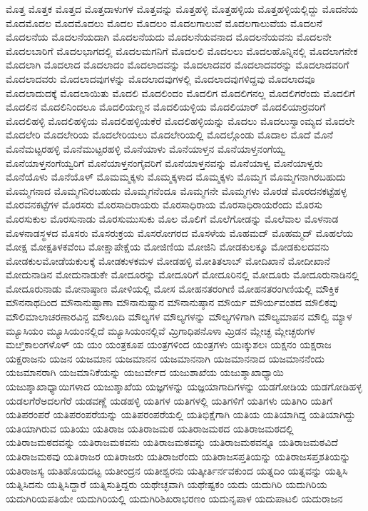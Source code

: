 {ಮೊತ್ತ
ಮೊತ್ತಕ
ಮೊತ್ತದ
ಮೊತ್ತದಾಳುಗಳ
ಮೊತ್ತವನ್ನು
ಮೊತ್ತಹಳ್ಳಿ
ಮೊತ್ತಹಳ್ಳಿಯ
ಮೊತ್ತಹಳ್ಳಿಯಲ್ಲಿದ್ದು
ಮೊದನೆಯ
ಮೊದಮೊದಲ
ಮೊದಮೊದಲು
ಮೊದಲ
ಮೊದಲಂ
ಮೊದಲಗಾಲುವೆ
ಮೊದಲಗಾಲುವೆಯ
ಮೊದಲನೆ
ಮೊದಲನೆಯ
ಮೊದಲನೆಯದಾಗಿ
ಮೊದಲನೆಯದು
ಮೊದಲನೆಯವನಾದ
ಮೊದಲನೆಯವನು
ಮೊದಲನೇ
ಮೊದಲಬಾರಿಗೆ
ಮೊದಲಭಾಗದಲ್ಲಿ
ಮೊದಲಮಗನಿಗೆ
ಮೊದಲಲಿ
ಮೊದಲಲು
ಮೊದಲಹೊನ್ನಿನಲ್ಲಿ
ಮೊದಲಾಗನೇಕ
ಮೊದಲಾಗಿ
ಮೊದಲಾದ
ಮೊದಲಾದಂ
ಮೊದಲಾದವನ್ನು
ಮೊದಲಾದವರ
ಮೊದಲಾದವರನ್ನು
ಮೊದಲಾದವರಿಗೆ
ಮೊದಲಾದವರು
ಮೊದಲಾದವುಗಳನ್ನು
ಮೊದಲಾದವುಗಳಲ್ಲಿ
ಮೊದಲಾದವುಗಳಿದ್ದವು
ಮೊದಲಾದವೂ
ಮೊದಲಾದುದಕ್ಕೆ
ಮೊದಲಾಯಿತು
ಮೊದಲಿ
ಮೊದಲಿಂದಂ
ಮೊದಲಿಗ
ಮೊದಲಿಗನಲ್ಲ
ಮೊದಲಿಗರೆಂದು
ಮೊದಲಿಗೆ
ಮೊದಲಿನ
ಮೊದಲಿನಿಂದಲೂ
ಮೊದಲಿಯಣ್ಣನ
ಮೊದಲಿಯಳ್ಳಿಯ
ಮೊದಲಿಯಾರ್
ಮೊದಲಿಯಾರ್ರವರಿಗೆ
ಮೊದಲಿಹಳ್ಳಿ
ಮೊದಲಿಹಳ್ಳಿಯ
ಮೊದಲಿಹಳ್ಳಿಯಕೆರೆ
ಮೊದಲಿಹಳ್ಳಿಯನ್ನು
ಮೊದಲು
ಮೊದಲುಸ್ವಾಂಮ್ಯದ
ಮೊದಲೇ
ಮೊದಲೇರಿ
ಮೊದಲೇರಿಯ
ಮೊದಲೇರಿಯಲು
ಮೊದಲೇರಿಯಲ್ಲಿ
ಮೊದಲ್ಗೊಂಡು
ಮೊದಾಲ
ಮೊದೆ
ಮೊನೆ
ಮೊನೆಮಟ್ಟರಹಳ್ಳಿ
ಮೊನೆಮುಟ್ಟರಹಳ್ಳಿ
ಮೊನೆಯಾಳು
ಮೊನೆಯಾಳ್ತನ
ಮೊನೆಯಾಳ್ತನಂಗೆಯ್ವ
ಮೊನೆಯಾಳ್ತನಂಗೆಯ್ವರಿಗೆ
ಮೊನೆಯಾಳ್ತನಂಗೈವರಿಗೆ
ಮೊನೆಯಾಳ್ತನವನ್ನು
ಮೊನೆಯಾಳ್ವ
ಮೊನೆಯಾಳ್ವರು
ಮೊನೆಯೊಳು
ಮೊನೆಯೊಳ್
ಮೊಮಮ್ಮಕ್ಕಳು
ಮೊಮ್ಮಕ್ಕಳಾದ
ಮೊಮ್ಮಕ್ಕಳು
ಮೊಮ್ಮಗ
ಮೊಮ್ಮಗನಾಗಿರಬಹುದು
ಮೊಮ್ಮಗನಾದ
ಮೊಮ್ಮಗನಿರಬಹುದು
ಮೊಮ್ಮಗನೆಂದೂ
ಮೊಮ್ಮಗನೇ
ಮೊಮ್ಮಗಳು
ಮೊರಡೆ
ಮೊರದನಕಟ್ಟೆಹಳ್ಳ
ಮೊರವನಕಟ್ಟೆಗಳ
ಮೊರಸರು
ಮೊರಸಾದಿರಾಯರು
ಮೊರಸಾಧಿರಾಯ
ಮೊರಸಾಧಿರಾಯರೆಂದು
ಮೊರಸು
ಮೊರಸುಕುಲ
ಮೊರಸುನಾಡು
ಮೊರಸುಮುಸುಕು
ಮೊಲ
ಮೊಲಿಗೆ
ಮೊಲೆಗೋಡನ್ನು
ಮೊಲೆವಾಲ
ಮೊಳನಾಡ
ಮೊಳನಾಡಸ್ಥಳದ
ಮೊಸರು
ಮೊಸರುಕ್ರಯ
ಮೊಸರೋಗರದ
ಮೊಸಳೆಯ
ಮೊಹಮದ್
ಮೊಹಮ್ಮದ್
ಮೊಹಲೆಯ
ಮೋಕ್ಷ
ಮೋಕ್ಷತಿಳಕವೆಂಬ
ಮೋಕ್ಷಾಪೇಕ್ಷೆಯ
ಮೋಜಿಣಿಯ
ಮೋಜಿನಿ
ಮೋಡಕುಲಕ್ಕೂ
ಮೋಡಕುಲದವನು
ಮೋಡಕುಲಮೋಡೆಯಕುಲಕ್ಕೆ
ಮೋಡಕುಳಕಮಳ
ಮೋಡಹಳ್ಳಿ
ಮೋತಿತಲಾಬ್
ಮೋದಿಖಾನೆ
ಮೋದೀಖಾನೆ
ಮೋದುನಾಡಿನ
ಮೋದುನಾಡುಕೇ
ಮೋದೂರನ್ನು
ಮೋದೂರಿಗೆ
ಮೋದೂರಿನಲ್ಲಿ
ಮೋದೂರು
ಮೋದೂರುನಾಡಿನಲ್ಲಿ
ಮೋದೂರುನಾಡು
ಮೋನಾಷ್ಠಾಣ
ಮೋಳಿಯಲ್ಲಿ
ಮೋಸ
ಮೋಹನತರಂಗಿಣಿ
ಮೋಹನತರಂಗಿಣಿಯಲ್ಲಿ
ಮೌಕ್ತಿಕ
ಮೌನನಾಥದಿಂದ
ಮೌನಾನುಷ್ಟಾಣಾ
ಮೌನಾನುಷ್ಟಾನ
ಮೌನಾನುಷ್ಠಾನ
ಮೌರ್ಯ
ಮೌರ್ಯವಂಶದ
ಮೌಲಿಕವು
ಮೌಲಿಮಾಲಾಚರಣಾರವಿನ್ದ
ಮೌಲೂದಿ
ಮೌಲ್ಯಗಳ
ಮೌಲ್ಯಗಳನ್ನು
ಮೌಲ್ಯಗಳಿಗಾಗಿ
ಮೌಲ್ಯಮಾಪನ
ಮೌಲ್ವಿ
ಮ್ಯಾಳ
ಮ್ಯೂಸಿಯಂ
ಮ್ಯೂಸಿಯಂನಲ್ಲಿದೆ
ಮ್ಯೂಸಿಯಂನಲ್ಲಿವೆ
ಮ್ರಿಗಾಧಿಪನೊಳಾ
ಮ್ರಿಡನ
ಮ್ಲೇಚ್ಛ
ಮ್ಲೇಚ್ಛರುಗಳ
ಮೞ್ತಿಕಾಲಂಗಳೊಳ್
ಯ
ಯಂ
ಯಂತ್ರಕೂಪ
ಯಂತ್ರಗಳಿಂದ
ಯಂತ್ರಗಳು
ಯಃಕ್ಕುಶಲಃ
ಯಕ್ಷನಂ
ಯಕ್ಷರಾಜ
ಯಕ್ಷರಾಜನು
ಯಜನ
ಯಜಮಾನ
ಯಜಮಾನನ
ಯಜಮಾನನಾಗಿ
ಯಜಮಾನನಾದ
ಯಜಮಾನನೆಂದು
ಯಜಮಾನರಾಗಿ
ಯಜಮಾನಿಕೆಯನ್ನು
ಯಜುರ್ವೇದ
ಯಜುಶಾಖೆಯ
ಯಜುಶ್ಶಾಖಾಧ್ಯಾಯಿ
ಯಜುಶ್ಶಾಖಾಧ್ಯಾಯಿಗಳಾದ
ಯಜುಶ್ಶಾಖೆಯ
ಯಜ್ಞಗಳನ್ನು
ಯಜ್ಞಯಾಗಾದಿಗಳನ್ನು
ಯಡಗೋಡಿಯ
ಯಡಗೋಡಿಹಳ್ಳ
ಯಡಲಗೆರೆಅದಲಗೆರೆ
ಯಡವಣ್ಣೆ
ಯಡಹಳ್ಳಿ
ಯತಿಗಳ
ಯತಿಗಳಲ್ಲಿ
ಯತಿಗಳಿಗೆ
ಯತಿಗಳು
ಯತಿಗಿರಿ
ಯತಿಗೆ
ಯತಿಪರಂಪರೆ
ಯತಿಪರಂಪರೆಯನ್ನು
ಯತಿಪರಂಪರೆಯಲ್ಲಿ
ಯತಿಭಿಕ್ಷೆಗಾಗಿ
ಯತಿಯ
ಯತಿಯಾಗಿದ್ದ
ಯತಿಯಾಗಿದ್ದು
ಯತಿಯಾಗಿರುವ
ಯತಿಯು
ಯತಿರಾಜ
ಯತಿರಾಜಮಠ
ಯತಿರಾಜಮಠದ
ಯತಿರಾಜಮಠದಲ್ಲಿ
ಯತಿರಾಜಮಠದವನ್ನು
ಯತಿರಾಜಮಠವನು
ಯತಿರಾಜಮಠವನ್ನು
ಯತಿರಾಜಮಠವನ್ನೂ
ಯತಿರಾಜಮಠವಿದೆ
ಯತಿರಾಜಮಠವು
ಯತಿರಾಜರ
ಯತಿರಾಜರು
ಯತಿರಾಜರೆಂದು
ಯತಿರಾಜಸಪ್ತತಿಯನ್ನು
ಯತಿರಾಜಸಪ್ತಶತಿಯನ್ನು
ಯತಿರಾಜಸ್ಯ
ಯತಿಹೊಯದಟ್ಟ
ಯತೀಂದ್ರನ
ಯತೀಶ್ವರನು
ಯತ್ಕೀರ್ತಿರ್ನವಕುಂದ
ಯತ್ನದಿಂ
ಯತ್ನವನ್ನು
ಯತ್ನಿಸಿ
ಯತ್ನಿಸಿದನು
ಯತ್ನಿಸಿದ್ದಾರೆ
ಯತ್ನಿಸುತ್ತಿದ್ದರು
ಯಥೇಚ್ಛವಾಗಿ
ಯಥೇಷ್ಟಕಂ
ಯದು
ಯದುಗಿರಿ
ಯದುಗಿರಿಯ
ಯದುಗಿರಿಯಪತಿಯೇ
ಯದುಗಿರಿಯಲ್ಲಿ
ಯದುಗಿರಿಶಿಖರಾಭರಣಂ
ಯದುನೃಪಾಳ
ಯದುಪಾಟಲಿ
ಯದುರಾಜನ
}
